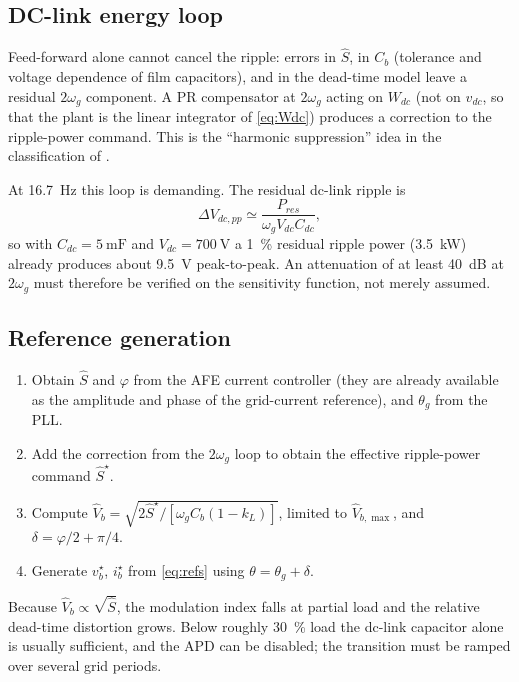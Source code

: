\documentclass[11pt,a4paper]{article}
\begin{document}
\subsection{DC-link energy loop}

Feed-forward alone cannot cancel the ripple: errors in $\hat S$, in $C_b$
(tolerance and voltage dependence of film capacitors), and in the dead-time
model leave a residual $2\omega_g$ component. A PR compensator at $2\omega_g$
acting on $W_{dc}$ (not on $v_{dc}$, so that the plant is the linear integrator
of \eqref{eq:Wdc}) produces a correction to the ripple-power command. This is
the ``harmonic suppression'' idea in the classification of
\cite{liu2021review}.

At \SI{16.7}{\hertz} this loop is demanding. The residual dc-link ripple is
\begin{equation}
\Delta V_{dc,pp} \simeq \frac{P_{res}}{\omega_g V_{dc} C_{dc}} ,
\end{equation}
so with $C_{dc}=\SI{5}{\milli\farad}$ and $V_{dc}=\SI{700}{\volt}$ a
\SI{1}{\percent} residual ripple power (\SI{3.5}{\kilo\watt}) already produces
about \SI{9.5}{\volt} peak-to-peak. An attenuation of at least
\SI{40}{\deci\bel} at $2\omega_g$ must therefore be verified on the sensitivity
function, not merely assumed.

\subsection{Reference generation}

\begin{enumerate}
\item Obtain $\hat S$ and $\varphi$ from the AFE current controller (they are
already available as the amplitude and phase of the grid-current reference), and
$\theta_g$ from the PLL.
\item Add the correction from the $2\omega_g$ loop to obtain the effective
ripple-power command $\hat S^\star$.
\item Compute $\hat V_b = \sqrt{2\hat S^\star / [\omega_g C_b(1-k_L)]}$, limited
to $\hat V_{b,\max}$, and $\delta = \varphi/2 + \pi/4$.
\item Generate $v_b^\star$, $i_b^\star$ from \eqref{eq:refs} using
$\theta = \theta_g + \delta$.
\end{enumerate}

Because $\hat V_b \propto \sqrt{\hat S}$, the modulation index falls at partial
load and the relative dead-time distortion grows. Below roughly \SI{30}{\percent}
load the dc-link capacitor alone is usually sufficient, and the APD can be
disabled; the transition must be ramped over several grid periods.
\end{document}

